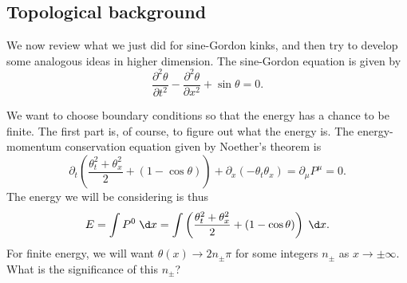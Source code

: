 \documentclass[a4paper]{article}
\begin{document}
\subsection{Topological background}
We now review what we just did for sine-Gordon kinks, and then try to develop some analogous ideas in higher dimension. The sine-Gordon equation is given by
\[
  \frac{\partial^2 \theta}{\partial t^2} - \frac{\partial^2 \theta}{\partial x^2} + \sin \theta = 0.
\]

We want to choose boundary conditions so that the energy has a chance to be finite. The first part is, of course, to figure out what the energy is. The energy-momentum conservation equation given by Noether's theorem is
\[
  \partial_t \left(\frac{\theta_t^2 + \theta_x^2}{2} + (1 - \cos \theta)\right) + \partial_x (-\theta_t \theta_x) = \partial_\mu P^\mu = 0.
\]
The energy we will be considering is thus
\[
  E = \int P^0 \;\d x = \int \left(\frac{\theta_t^2 + \theta_x^2}{2} + (1 - \cos \theta)\right)\;\d x.
\]
For finite energy, we will want $\theta(x) \to 2n_{\pm} \pi$ for some integers $n_{\pm}$ as $x \to \pm \infty$. What is the significance of this $n_{\pm}$?
\end{document}
